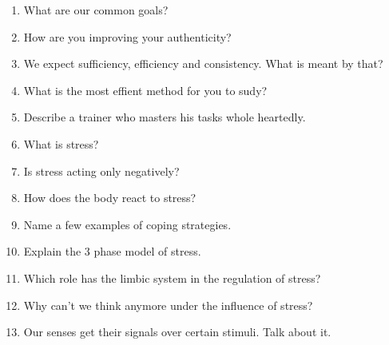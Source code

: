 \documentclass[../main.tex]{subfiles}
\begin{document}
\begin{enumerate}
\item What are our common goals?
\item How are you improving your authenticity?
\item We expect sufficiency, efficiency and consistency. What is meant by that?
\item What is the most effient method for you to sudy?
\item Describe a trainer who masters his tasks whole heartedly.
\item What is stress?
\item  Is stress acting only negatively?
\item How does the body react to stress?
\item Name a few examples of coping strategies.
\item Explain the 3 phase model of stress.
\item Which role has the limbic system in the regulation of stress?
\item Why can't we think anymore under the influence of stress?
\item  Our senses get their signals over certain stimuli. Talk about it.
  \end{enumerate}
\end{document}
